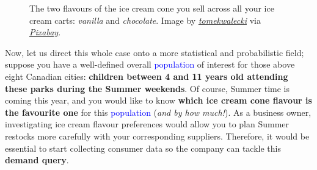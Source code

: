 \documentclass[
  letterpaper,
  DIV=11,
  numbers=noendperiod]{scrreprt}
\begin{document}
\begin{figure}


\caption{\label{fig-ice-cream}The two flavours of the ice cream cone you
sell across all your ice cream carts: \emph{vanilla} and
\emph{chocolate}. Image by
\href{https://pixabay.com/users/tomekwalecki-13027968/}{\emph{tomekwalecki}}
via
\href{https://pixabay.com/photos/ice-cream-flavor-chocolate-vanilla-4401300/}{\emph{Pixabay}}.}

\end{figure}%

Now, let us direct this whole case onto a more statistical and
probabilistic field; suppose you have a well-defined overall
\textcolor{blue}{population} of interest for those above eight Canadian
cities: \textbf{children between 4 and 11 years old attending these
parks during the Summer weekends}. Of course, Summer time is coming this
year, and you would like to know \textbf{which ice cream cone flavour is
the favourite one} for this \textcolor{blue}{population} (\emph{and by
how much!}). As a business owner, investigating ice cream flavour
preferences would allow you to plan Summer restocks more carefully with
your corresponding suppliers. Therefore, it would be essential to start
collecting consumer data so the company can tackle this \textbf{demand
query}.
\end{document}
